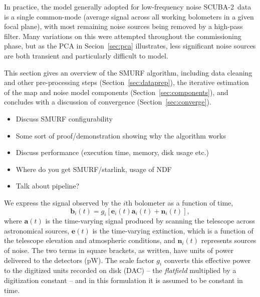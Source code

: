 \documentclass[useAMS,usenatbib,nofootinbib]{mn2e}
\newcommand{\scuba}{SCUBA-2}
\begin{document}
In practice, the model generally adopted for low-frequency noise
\scuba\ data is a single common-mode (average signal across all
working bolometers in a given focal plane), with most remaining noise
sources being removed by a high-pass filter. Many variations on this
were attempted throughout the commissioning phase, but as the PCA in
Secion~\ref{sec:pca} illustrates, less significant noise sources are
both transient and particularly difficult to model.

This section gives an overview of the SMURF algorithm, including data
cleaning and other pre-processing steps (Section~\ref{sec:dataprep}),
the iterative estimation of the map and noise model components
(Section~\ref{sec:components}), and concludes with a discussion of
convergence (Section~\ref{sec:converge}).

\begin{itemize}

\item Discuss SMURF configurability

\item Some sort of proof/demonstration showing why the algorithm works

\item Discuss performance (execution time, memory, disk usage etc.)

\item Where do you get SMURF/starlink, usage of NDF

\item Talk about pipeline?

\end{itemize}

We express the signal observed by the $i$th bolometer as a function of
time,
%
\begin{equation}
\mathbf{b}_i(t) = g_i[\mathbf{e}_i(t) \mathbf{a}_i(t) + \mathbf{n}_i(t)],
\end{equation}
%
where $\mathbf{a}(t)$ is the time-varying signal produced by scanning
the telescope across astronomical sources, $\mathbf{e}(t)$ is the
time-varying extinction, which is a function of the telescope
elevation and atmospheric conditions, and $\mathbf{n}_i(t)$ represents
sources of noise. The two terms in square brackets, as written, have
units of power delivered to the detectors (pW). The scale factor $g_i$
converts this effective power to the digitized units recorded on disk
(DAC) -- the \emph{flatfield} multiplied by a digitization constant --
and in this formulation it is assumed to be constant in time.
\end{document}
